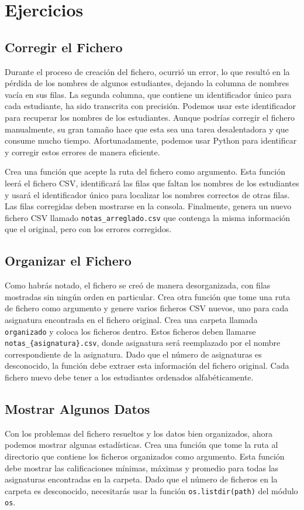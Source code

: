 \documentclass[10pt,a4paper]{article}
\begin{document}
\newpage
\section{Ejercicios}
\subsection{Corregir el Fichero}

Durante el proceso de creación del fichero, ocurrió un error, lo que resultó en la pérdida de los nombres de algunos estudiantes, dejando la columna de nombres vacía en sus filas. La segunda columna, que contiene un identificador único para cada estudiante, ha sido transcrita con precisión. Podemos usar este identificador para recuperar los nombres de los estudiantes. Aunque podrías corregir el fichero manualmente, su gran tamaño hace que esta sea una tarea desalentadora y que consume mucho tiempo. Afortunadamente, podemos usar Python para identificar y corregir estos errores de manera eficiente.

Crea una función que acepte la ruta del fichero como argumento. Esta función leerá el fichero CSV, identificará las filas que faltan los nombres de los estudiantes y usará el identificador único para localizar los nombres correctos de otras filas. Las filas corregidas deben mostrarse en la consola. Finalmente, genera un nuevo fichero CSV llamado \texttt{notas\_arreglado.csv} que contenga la misma información que el original, pero con los errores corregidos.

\subsection{Organizar el Fichero}

Como habrás notado, el fichero se creó de manera desorganizada, con filas mostradas sin ningún orden en particular. Crea otra función que tome una ruta de fichero como argumento y genere varios ficheros CSV nuevos, uno para cada asignatura encontrada en el fichero original. Crea una carpeta llamada \texttt{organizado} y coloca los ficheros dentro. Estos ficheros deben llamarse \texttt{notas\_\{asignatura\}.csv}, donde asignatura será reemplazado por el nombre correspondiente de la asignatura. Dado que el número de asignaturas es desconocido, la función debe extraer esta información del fichero original. Cada fichero nuevo debe tener a los estudiantes ordenados alfabéticamente.

\subsection{Mostrar Algunos Datos}

Con los problemas del fichero resueltos y los datos bien organizados, ahora podemos mostrar algunas estadísticas. Crea una función que tome la ruta al directorio que contiene los ficheros organizados como argumento. Esta función debe mostrar las calificaciones mínimas, máximas y promedio para todas las asignaturas encontradas en la carpeta. Dado que el número de ficheros en la carpeta es desconocido, necesitarás usar la función \lstinline|os.listdir(path)| del módulo \lstinline|os|.
\end{document}
